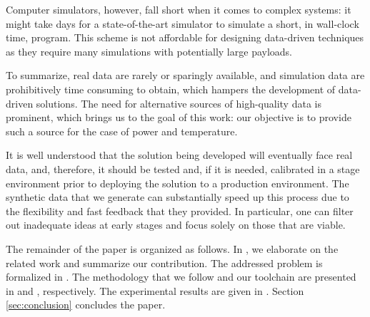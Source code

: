 Computer simulators, however, fall short when it comes to complex systems: it
might take days for a state-of-the-art simulator to simulate a short, in
wall-clock time, program. This scheme is not affordable for designing
data-driven techniques as they require many simulations with potentially large
payloads.

To summarize, real data are rarely or sparingly available, and simulation data
are prohibitively time consuming to obtain, which hampers the development of
data-driven solutions. The need for alternative sources of high-quality data is
prominent, which brings us to the goal of this work: our objective is to provide
such a source for the case of power and temperature.

It is well understood that the solution being developed will eventually face
real data, and, therefore, it should be tested and, if it is needed, calibrated
in a stage environment prior to deploying the solution to a production
environment. The synthetic data that we generate can substantially speed up this
process due to the flexibility and fast feedback that they provided. In
particular, one can filter out inadequate ideas at early stages and focus solely
on those that are viable.

The remainder of the paper is organized as follows. In , we
elaborate on the related work and summarize our contribution. The addressed
problem is formalized in . The methodology that we follow and our
toolchain are presented in  and ,
respectively. The experimental results are given in . Section
\ref{sec:conclusion} concludes the paper.

